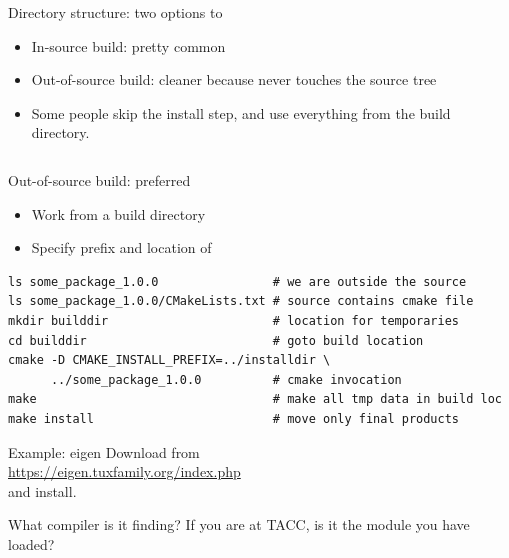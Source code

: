 \begin{numberedframe}{Directory structure: two options}
  \hbox to \textwidth\bgroup
  \begin{minipage}{.45\textwidth}
  \end{minipage}
  \hss
  \begin{minipage}{.45\textwidth}
  \end{minipage}
  \egroup
  \begin{itemize}
  \item In-source build: pretty common
  \item Out-of-source build: cleaner because never touches the source tree
  \item Some people skip the install step, and use everything from the build directory.
  \end{itemize}
\begin{lstlisting}
\end{lstlisting}
\end{numberedframe}

\begin{numberedframe}{Out-of-source build: preferred}
  \begin{itemize}
  \item Work from a build directory
  \item Specify prefix and location of 
  \end{itemize}
\lstset{numbers=left,numberstyle=\tiny}
\begin{lstlisting}
ls some_package_1.0.0                # we are outside the source
ls some_package_1.0.0/CMakeLists.txt # source contains cmake file
mkdir builddir                       # location for temporaries
cd builddir                          # goto build location
cmake -D CMAKE_INSTALL_PREFIX=../installdir \
      ../some_package_1.0.0          # cmake invocation
make                                 # make all tmp data in build loc
make install                         # move only final products
\end{lstlisting}
\end{numberedframe}

\begin{numberedframe}{Example: eigen}
  Download from\\
  \url{https://eigen.tuxfamily.org/index.php}\\
  and install.

  What compiler is it finding? If you are at TACC,
  is it the module you have loaded?
\end{numberedframe}

